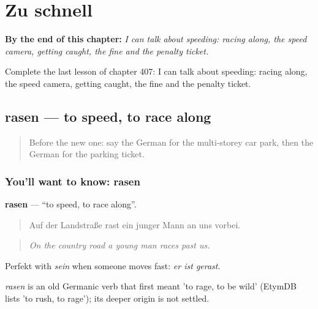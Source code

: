 
\chapter{Zu schnell}
\label{ch:ge-zu-schnell}

\begin{chapteropening}
\textbf{By the end of this chapter:} \emph{I can talk about speeding: racing along, the speed camera, getting caught, the fine and the penalty ticket.}

Complete the last lesson of chapter 407: I can talk about speeding: racing along, the speed camera, getting caught, the fine and the penalty ticket.
\end{chapteropening}

\section[rasen]{rasen — to speed, to race along}

\label{lesson:GE-C407-rasen}



\begin{quote}
Before the new one: say the German for the multi-storey car park, then the German for the parking ticket.
\end{quote}

\subsection*{You'll want to know: rasen}
\textbf{rasen} — \textquotedblleft{}to speed, to race along\textquotedblright{}.

\begin{quote}
Auf der Landstraße rast ein junger Mann an uns vorbei.
\end{quote}

\begin{quote}
\emph{On the country road a young man races past us.}
\end{quote}

Perfekt with \emph{sein} when someone moves fast: \emph{er ist gerast}.

\begin{cousinweb}
\emph{rasen} is an old Germanic verb that first meant 'to rage, to be wild' (EtymDB lists 'to rush, to rage'); its deeper origin is not settled.
\end{cousinweb}

